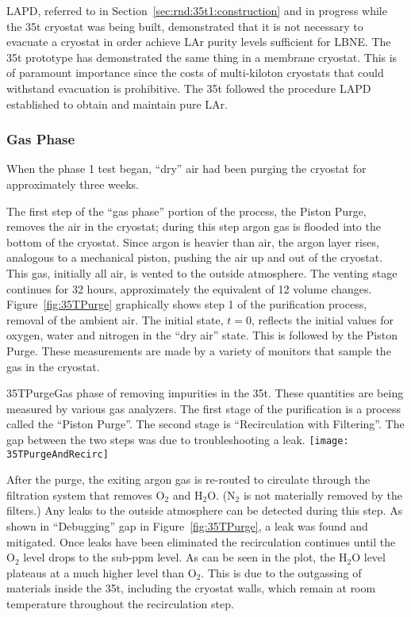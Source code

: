 LAPD, referred to in Section~\ref{sec:rnd:35t1:construction} and in progress while the 35t cryostat was
being built,
demonstrated that it is not necessary to evacuate a cryostat in order achieve 
LAr purity levels sufficient for LBNE. The 35t prototype has demonstrated the same thing in a membrane cryostat. 
This is of paramount importance since the costs of multi-kiloton cryostats that 
could withstand evacuation is prohibitive. 
The 35t followed the procedure LAPD~\cite{bib:lapdP07005}
established to obtain and maintain pure LAr. 

\subsubsection {Gas Phase}

When the phase 1 test began, ``dry'' air had been purging the cryostat for approximately three weeks. 

The first step of the ``gas phase'' portion of the process, the Piston Purge, removes the air in the cryostat; during this step argon gas is flooded into the bottom of the cryostat. Since argon is heavier than air, the argon layer rises, analogous to a mechanical piston, pushing the air up and out of the cryostat. This gas, initially all air, is vented to the outside atmosphere. The venting stage continues for 32 hours, approximately the equivalent of 12 volume changes. 
%
Figure~\ref{fig:35TPurge} graphically shows step 1 of the purification process, removal of the ambient air. The initial state, $t=0$, reflects the initial values for oxygen, water and nitrogen in the ``dry air'' state. This is followed by the Piston Purge.
These measurements are made by a variety of %
monitors that sample the gas in the cryostat. 

\begin{cdrfigure}{35TPurge}{Gas phase of removing impurities in the 35t. These quantities are being measured by various gas analyzers. The first stage of the purification is a process called the ``Piston Purge''.  The second stage is ``Recirculation with Filtering''. The gap between the two steps was due to troubleshooting a leak.}
  \texttt{[image: 35TPurgeAndRecirc]}
\end{cdrfigure}


After the purge, the exiting argon gas is re-routed to circulate through the filtration system that removes O$_2$ and H$_2$O. (N$_2$ is not materially removed by the filters.) Any leaks to the outside atmosphere can be detected during this step. As shown in ``Debugging'' gap in Figure~\ref{fig:35TPurge}, a leak was found and mitigated. Once leaks have been eliminated the recirculation continues until the O$_2$ level drops to the sub-ppm level. As can be seen in the plot, the H$_2$O level plateaus at a much higher level than O$_2$. This is due to the outgassing of materials inside the 35t, including the cryostat walls, which remain at room temperature throughout the recirculation step. 

